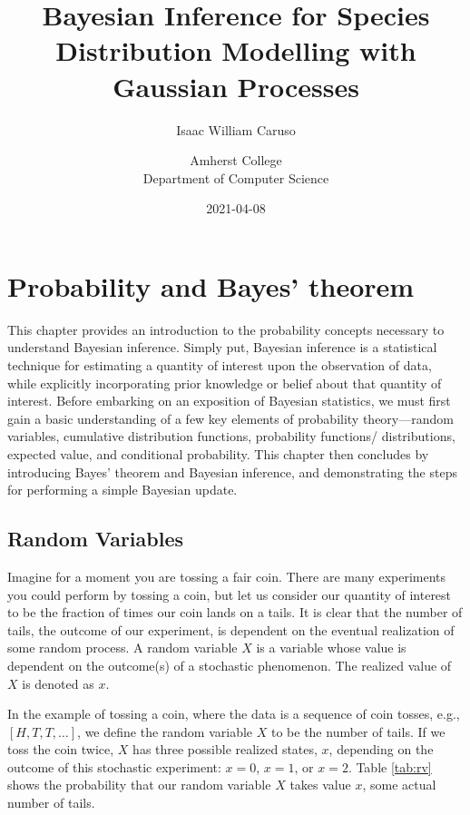 \documentclass[
  12pt,
]{book}
\title{Bayesian Inference for Species Distribution Modelling with Gaussian Processes}
\subtitle{Isaac William Caruso}
\author{Amherst College\\
Department of Computer Science}
\date{2021-04-08}
\theoremstyle{definition}
\theoremstyle{definition}
\theoremstyle{definition}
\theoremstyle{remark}
\begin{document}
\maketitle

{
\setcounter{tocdepth}{1}
\tableofcontents
}
\hypertarget{probability-and-bayes-theorem}{%
\chapter{Probability and Bayes' theorem}\label{probability-and-bayes-theorem}}

This chapter provides an introduction to the probability concepts necessary to understand Bayesian inference.
Simply put, Bayesian inference is a statistical technique for estimating a quantity of interest upon the observation of data, while explicitly incorporating prior knowledge or belief about that quantity of interest.
Before embarking on an exposition of Bayesian statistics, we must first gain a basic understanding of a few key elements of probability theory---random variables, cumulative distribution functions, probability functions/ distributions, expected value, and conditional probability.
This chapter then concludes by introducing Bayes' theorem and Bayesian inference, and demonstrating the steps for performing a simple Bayesian update.

\hypertarget{random-variables}{%
\section{Random Variables}\label{random-variables}}

Imagine for a moment you are tossing a fair coin.
There are many experiments you could perform by tossing a coin, but let us consider our quantity of interest to be the fraction of times our coin lands on a tails.
It is clear that the number of tails, the outcome of our experiment, is dependent on the eventual realization of some random process.
A random variable \(X\) is a variable whose value is dependent on the outcome(s) of a stochastic phenomenon.
The realized value of \(X\) is denoted as \(x\).

In the example of tossing a coin, where the data is a sequence of coin tosses, e.g., \([H, T, T, …]\), we define the random variable \(X\) to be the number of tails.
If we toss the coin twice, \(X\) has three possible realized states, \(x\), depending on the outcome of this stochastic experiment: \(x = 0\), \(x = 1\), or \(x = 2\).
Table \ref{tab:rv} shows the probability that our random variable \(X\) takes value \(x\), some actual number of tails.
\end{document}
